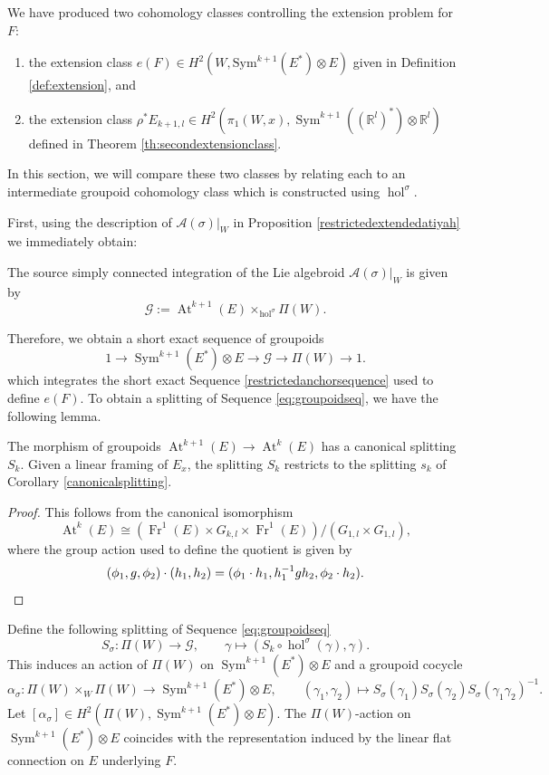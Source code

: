\documentclass[10pt]{amsart}
\newcommand{\A}{{\mathcal{A}}}
\newcommand{\Gcal}{{\mathcal{G}}}
\newcommand{\hol}{{\operatorname{hol}}}
\newcommand{\Fr}{{\operatorname{Fr}}}
\newcommand{\rr}{\mathbb{R}}
\DeclareMathOperator{\Sym}{Sym}
\DeclareMathOperator{\At}{At}
\numberwithin{theoremalpha}{section}
\numberwithin{equation}{section}
\numberwithin{definition}{section}
\numberwithin{theorem}{section}
\numberwithin{proposition}{section}
\numberwithin{lemma}{section}
\numberwithin{example}{section}
\numberwithin{remark}{section}
\numberwithin{corollary}{section}
\numberwithin{question}{section}
\numberwithin{problem}{section}
\numberwithin{assumption}{section}
\theoremstyle{named}
\numberwithin{equation}{section}
\begin{document}
We have produced two cohomology classes controlling the extension problem for $F$: 
\begin{enumerate}
\item the extension class $e(F) \in H^{2}(W, \mathrm{Sym}^{k+1}(E^*) \otimes E)$ given in Definition \ref{def:extension}, and 
\item the extension class $\rho^*E_{k+1,l} \in H^2(\pi_1(W,x),\Sym^{k+1}((\rr^{l})^*) \otimes \rr^l)$ defined in Theorem \ref{th:secondextensionclass}.
\end{enumerate}
In this section, we will compare these two classes by relating each to an intermediate groupoid cohomology class which is constructed using $\hol^{\sigma}$. 

First, using the description of $\A(\sigma)|_W$ in Proposition \ref{restrictedextendedatiyah} we immediately obtain:
\begin{lemma}
The source simply connected integration of the Lie algebroid $\A(\sigma)|_W$ is given by 
\[ \Gcal := \At^{k+1}(E) \times_{\hol^{\sigma}} \Pi(W). \]
\end{lemma}
Therefore, we obtain a short exact sequence of groupoids 
\begin{equation}\label{eq:groupoidseq}
1 \to \Sym^{k+1}(E^*)\otimes E \to \Gcal \to \Pi(W) \to 1. 
\end{equation}
which integrates the short exact Sequence \ref{restrictedanchorsequence} used to define $e(F)$. To obtain a splitting of Sequence \ref{eq:groupoidseq}, we have the following lemma. 
\begin{lemma}
The morphism of groupoids $\At^{k+1}(E) \to \At^{k}(E)$ has a canonical splitting $S_k$. Given a linear framing of $E_{x}$, the splitting $S_k$ restricts to the splitting $s_k$ of Corollary \ref{canonicalsplitting}.  
\end{lemma}
\begin{proof}
This follows from the canonical isomorphism  
\[
\At^{k}(E) \cong (\Fr^1(E) \times G_{k,l} \times \Fr^1(E) )/(G_{1,l} \times G_{1,l}),
\]
where the group action used to define the quotient is given by 
\[
(\phi_1, g, \phi_2) \cdot (h_1, h_2) = (\phi_1 \cdot h_1, h_{1}^{-1} g h_{2}, \phi_2 \cdot h_2). \hfill \qedhere
\]  
\end{proof}
Define the following splitting of Sequence \ref{eq:groupoidseq} 
\[
S_{\sigma}: \Pi(W) \to \mathcal{G}, \qquad \gamma \mapsto (S_{k} \circ \hol^{\sigma}(\gamma), \gamma). 
\]
This induces an action of $\Pi(W)$ on $\Sym^{k+1}(E^*)\otimes E$ and a groupoid cocycle 
\[
\alpha_{\sigma} : \Pi(W) \times_{W} \Pi(W) \to \Sym^{k+1}(E^*)\otimes E, \qquad (\gamma_1, \gamma_2) \mapsto S_{\sigma}(\gamma_{1}) S_{\sigma}(\gamma_2) S_{\sigma}(\gamma_1 \gamma_2)^{-1}. 
\]
Let $[\alpha_{\sigma}] \in H^{2}(\Pi(W), \Sym^{k+1}(E^*)\otimes E)$. The $\Pi(W)$-action on $\Sym^{k+1}(E^*)\otimes E$ coincides with the representation induced by the linear flat connection on $E$ underlying $F$. 
\end{document}
